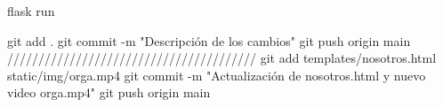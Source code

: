 flask run


git add .
git commit -m "Descripción de los cambios"
git push origin main
////////////////////////////////////////
git add templates/nosotros.html static/img/orga.mp4
git commit -m "Actualización de nosotros.html y nuevo video orga.mp4"
git push origin main

